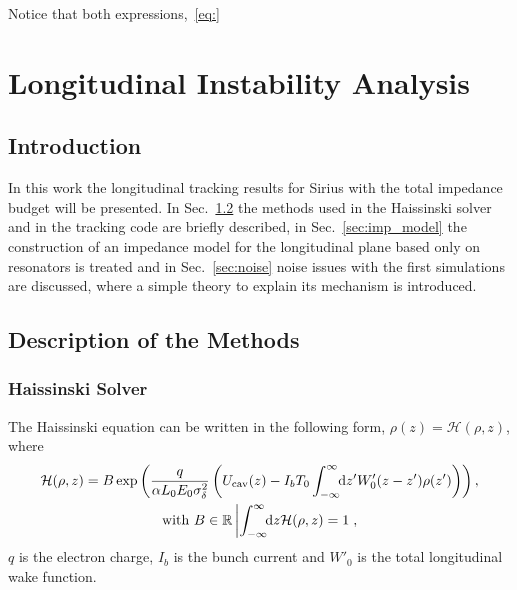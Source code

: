 \begin{apendicesenv}
    Notice that both expressions,~\eqref{eq:}


\chapter{Longitudinal Instability Analysis}

\section{Introduction}

    In this work the longitudinal tracking results for Sirius with the total impedance budget will be presented. In Sec.~\ref{sec:description} the methods used in the Haissinski solver and in the tracking code are briefly described, in Sec.~\ref{sec:imp_model} the construction of an impedance model for the longitudinal plane based only on resonators is treated and in Sec.~\ref{sec:noise} noise issues with the first simulations are discussed, where a simple theory to explain its mechanism is introduced.

\section{Description of the Methods}\label{sec:description}

\subsection{Haissinski Solver}\label{assec:haissinski_solver}
    The Haissinski equation can be written in the following form, $\rho(z) = \mathcal{H}(\rho,z)$, where
    \begin{gather}\nonumber
        \mathcal{H}(\rho,z) = B\exp\left(\frac{q}{\alpha L_0 E_0 \sigma_\delta^2}\left(U_\text{cav}(z)-I_b T_0\int_{-\infty}^{\infty}\!\!\text{d}z' W'_0(z-z')\rho(z')\right)\right),\\
        \text{with}\,\,B \in \mathbb{R} \left| \int_{-\infty}^{\infty}\!\!\text{d}z \mathcal{H}(\rho,z)=1\right.,
    \end{gather}
    $q$ is the electron charge, $I_b$ is the bunch current and $W'_0$ is the total longitudinal wake function.


\end{apendicesenv}
